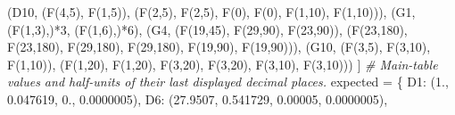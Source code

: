 \documentclass[
]{article}
\newenvironment{Shaded}{}{}
\newcommand{\CommentTok}[1]{\textcolor[rgb]{0.38,0.63,0.69}{\textit{#1}}}
\newcommand{\DecValTok}[1]{\textcolor[rgb]{0.25,0.63,0.44}{#1}}
\newcommand{\FloatTok}[1]{\textcolor[rgb]{0.25,0.63,0.44}{#1}}
\newcommand{\NormalTok}[1]{#1}
\newcommand{\OperatorTok}[1]{\textcolor[rgb]{0.40,0.40,0.40}{#1}}
\newcommand{\StringTok}[1]{\textcolor[rgb]{0.25,0.44,0.63}{#1}}
\begin{document}
\begin{Shaded}
\begin{Highlighting}[]
\NormalTok{        (}\StringTok{\textquotesingle{}D10\textquotesingle{}}\NormalTok{, (F(}\DecValTok{4}\NormalTok{,}\DecValTok{5}\NormalTok{), F(}\DecValTok{1}\NormalTok{,}\DecValTok{5}\NormalTok{)), (F(}\DecValTok{2}\NormalTok{,}\DecValTok{5}\NormalTok{), F(}\DecValTok{2}\NormalTok{,}\DecValTok{5}\NormalTok{), F(}\DecValTok{0}\NormalTok{), F(}\DecValTok{0}\NormalTok{), F(}\DecValTok{1}\NormalTok{,}\DecValTok{10}\NormalTok{), F(}\DecValTok{1}\NormalTok{,}\DecValTok{10}\NormalTok{))),}
\NormalTok{        (}\StringTok{\textquotesingle{}G1\textquotesingle{}}\NormalTok{, (F(}\DecValTok{1}\NormalTok{,}\DecValTok{3}\NormalTok{),)}\OperatorTok{*}\DecValTok{3}\NormalTok{, (F(}\DecValTok{1}\NormalTok{,}\DecValTok{6}\NormalTok{),)}\OperatorTok{*}\DecValTok{6}\NormalTok{),}
\NormalTok{        (}\StringTok{\textquotesingle{}G4\textquotesingle{}}\NormalTok{, (F(}\DecValTok{19}\NormalTok{,}\DecValTok{45}\NormalTok{), F(}\DecValTok{29}\NormalTok{,}\DecValTok{90}\NormalTok{), F(}\DecValTok{23}\NormalTok{,}\DecValTok{90}\NormalTok{)),}
\NormalTok{         (F(}\DecValTok{23}\NormalTok{,}\DecValTok{180}\NormalTok{), F(}\DecValTok{23}\NormalTok{,}\DecValTok{180}\NormalTok{), F(}\DecValTok{29}\NormalTok{,}\DecValTok{180}\NormalTok{), F(}\DecValTok{29}\NormalTok{,}\DecValTok{180}\NormalTok{), F(}\DecValTok{19}\NormalTok{,}\DecValTok{90}\NormalTok{), F(}\DecValTok{19}\NormalTok{,}\DecValTok{90}\NormalTok{))),}
\NormalTok{        (}\StringTok{\textquotesingle{}G10\textquotesingle{}}\NormalTok{, (F(}\DecValTok{3}\NormalTok{,}\DecValTok{5}\NormalTok{), F(}\DecValTok{3}\NormalTok{,}\DecValTok{10}\NormalTok{), F(}\DecValTok{1}\NormalTok{,}\DecValTok{10}\NormalTok{)),}
\NormalTok{         (F(}\DecValTok{1}\NormalTok{,}\DecValTok{20}\NormalTok{), F(}\DecValTok{1}\NormalTok{,}\DecValTok{20}\NormalTok{), F(}\DecValTok{3}\NormalTok{,}\DecValTok{20}\NormalTok{), F(}\DecValTok{3}\NormalTok{,}\DecValTok{20}\NormalTok{), F(}\DecValTok{3}\NormalTok{,}\DecValTok{10}\NormalTok{), F(}\DecValTok{3}\NormalTok{,}\DecValTok{10}\NormalTok{)))}
\NormalTok{    ]}
    \CommentTok{\# Main{-}table values and half{-}units of their last displayed decimal places.}
\NormalTok{    expected }\OperatorTok{=}\NormalTok{ \{}
        \StringTok{\textquotesingle{}D1\textquotesingle{}}\NormalTok{: (}\FloatTok{1.}\NormalTok{, }\FloatTok{0.047619}\NormalTok{, }\FloatTok{0.}\NormalTok{, }\FloatTok{0.0000005}\NormalTok{),}
        \StringTok{\textquotesingle{}D6\textquotesingle{}}\NormalTok{: (}\FloatTok{27.9507}\NormalTok{, }\FloatTok{0.541729}\NormalTok{, }\FloatTok{0.00005}\NormalTok{, }\FloatTok{0.0000005}\NormalTok{),}

\end{Highlighting}
\end{Shaded}
\end{document}
